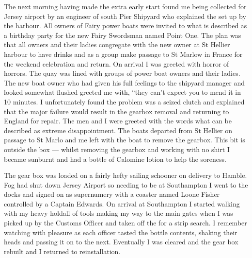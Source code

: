 The next morning having made the extra early start found me being collected for
Jersey airport by an engineer of south Pier Shipyard who explained the set up
by the harbour. All owners of Fairy power boats were invited to what is
described as a birthday party for the new Fairy Swordsman named Point One. The
plan was that all owners and their ladies congregate with the new owner at St
Hellier harbour to have drinks and as a group make passage to St Marlow in
France for the weekend celebration and return. On arrival I was greeted with
horror of horrors. The quay was lined with groups of power boat owners and
their ladies. The new boat owner who had given his full feelings to the
shipyard manager and looked somewhat flushed greeted me with, ``they can't
expect you to mend it in 10 minutes. I unfortunately found the problem was a
seized clutch and explained that the major failure would result in the gearbox
removal and returning to England for repair. The men and I were greeted with
the words what can be described as extreme disappointment. The boats departed
from St Hellier on passage to St Marlo and me left with the boat to remove the
gearbox. This bit is outside the box --- whilst removing the gearbox and working
with no shirt I became sunburnt and had a bottle of Calomine lotion to help the
soreness.

The gear box was loaded on a fairly hefty sailing schooner on delivery to
Hamble. Fog had shut down Jersey Airport so needing to be at Southampton I
went to the docks and signed on as supernumery with a coaster named Loone
Fisher controlled by a Captain Edwards. On arrival at Southampton I started
walking with my heavy holdall of tools making my way to the main gates when I
was picked up by the Customs Officer and taken off the for a strip search. I
remember watching with pleasure as each officer tasted the bottle contents,
shaking their heads and passing it on to the next. Eventually I was cleared
and the gear box rebuilt and I returned to reinstallation.

